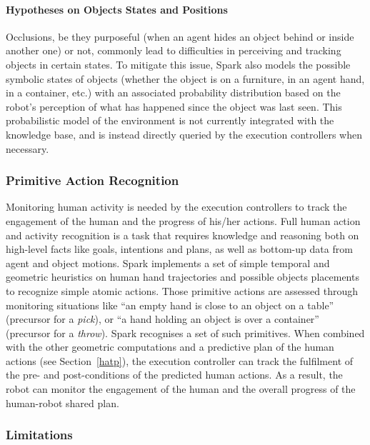 \documentclass[preprint,3p,times]{elsarticle}
\begin{document}
\paragraph{Hypotheses on Objects States and Positions}

Occlusions, be they purposeful (when an agent hides an object behind or inside
another one) or not, commonly lead to difficulties in perceiving and tracking
objects in certain states. To mitigate this issue, {\sc Spark} also models the
possible symbolic states of objects (whether the object is on a furniture, in an
agent hand, in a container, etc.) with an associated probability distribution
based on the robot's perception of what has happened since the object was last
seen.  This probabilistic model of the environment is not currently integrated
with the knowledge base, and is instead directly queried by the execution
controllers when necessary.

\subsubsection{Primitive Action Recognition}

Monitoring human activity is needed by the execution controllers to track the
engagement of the human and the progress of his/her actions. Full human action
and activity recognition is a task that requires knowledge and reasoning both on
high-level facts like goals, intentions and plans, as well as bottom-up data
from agent and object motions. {\sc Spark} implements a set of simple temporal and
geometric heuristics on human hand trajectories and possible objects placements
to recognize simple atomic actions. Those primitive actions are assessed through
monitoring situations like ``an empty hand is close to an object on a table''
(precursor for a \emph{pick}), or ``a hand holding an object is over a
container'' (precursor for a \emph{throw}).  {\sc Spark} recognises a set of
such primitives. When combined with the other geometric computations and a predictive
plan of the human actions (see Section~\ref{hatp}), the execution controller can
track the fulfilment of the pre- and post-conditions of the predicted human
actions. As a result, the robot can monitor the engagement of the human and the
overall progress of the human-robot shared plan.

\subsubsection{Limitations}
\end{document}

